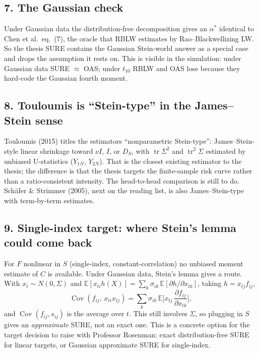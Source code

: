\documentclass[12pt]{article}
\begin{document}
\subsection*{7. The Gaussian check}
Under Gaussian data the distribution-free decomposition gives an $\alpha^*$ identical to Chen et al.\ eq.~(7),
the oracle that RBLW estimates by Rao--Blackwellizing LW. So the thesis SURE contains the Gaussian
Stein-world answer as a special case and drops the assumption it rests on. This is visible in the
simulation: under Gaussian data SURE $\approx$ OAS; under $t_{10}$ RBLW and OAS lose because they hard-code the
Gaussian fourth moment.

\subsection*{8. Touloumis is ``Stein-type'' in the James--Stein sense}
Touloumis (2015) titles the estimators ``nonparametric Stein-type'': James--Stein-style linear shrinkage
toward $\nu I$, $I$, or $D_S$, with $\operatorname{tr}\Sigma^2$ and $\operatorname{tr}^2\Sigma$ estimated by
unbiased U-statistics ($Y_{1N}$, $Y_{2N}$). That is the closest existing estimator to the thesis; the
difference is that the thesis targets the finite-sample risk curve rather than a ratio-consistent
intensity. The head-to-head comparison is still to do. Schäfer \& Strimmer (2005), next on the reading
list, is also James--Stein-type with term-by-term estimates.

\subsection*{9. Single-index target: where Stein's lemma could come back}
For $F$ nonlinear in $S$ (single-index, constant-correlation) no unbiased moment estimate of $C$ is
available. Under Gaussian data, Stein's lemma gives a route. With $x_t\sim N(0,\Sigma)$ and
$\mathbb{E}[x_{ti}h(X)]=\sum_k\sigma_{ik}\,\mathbb{E}[\partial h/\partial x_{tk}]$, taking $h=x_{tj}f_{ij}$,
\[
\operatorname{Cov}(f_{ij},\,x_{ti}x_{tj})=\sum_k\sigma_{ik}\,\mathbb{E}\Big[x_{tj}\,\frac{\partial f_{ij}}{\partial x_{tk}}\Big],
\]
and $\operatorname{Cov}(f_{ij},s_{ij})$ is the average over $t$. This still involves $\Sigma$, so plugging in
$S$ gives an \emph{approximate} SURE, not an exact one. This is a concrete option for the target decision
to raise with Professor Rosenman: exact distribution-free SURE for linear targets, or Gaussian
approximate SURE for single-index.
\end{document}

